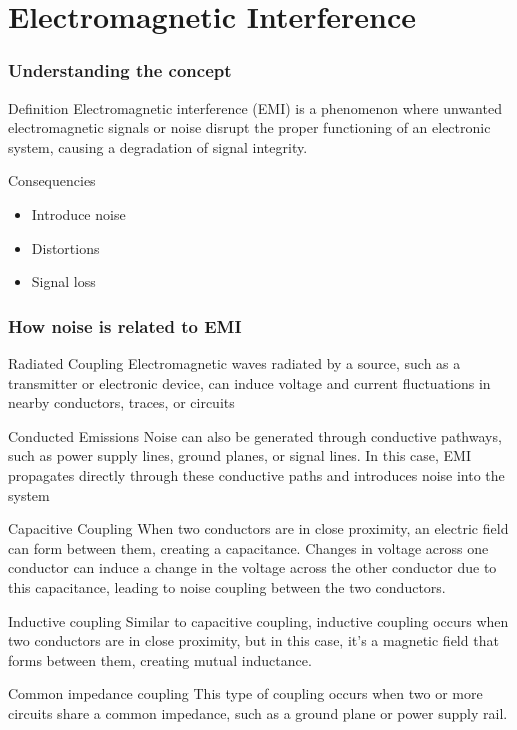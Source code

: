 \documentclass[10pt,hyperref={pdfpagemode=FullScreen},aspectratio=169]{beamer}
\begin{document}
\section{Electromagnetic Interference}


\begin{frame}
  \frametitle{Understanding the concept}

  \begin{block}{Definition}
    Electromagnetic interference (EMI) is a phenomenon where unwanted electromagnetic signals or noise disrupt the proper functioning of an electronic system, causing a degradation of signal integrity.
  \end{block}

  \begin{block}{Consequencies}
    \begin{itemize}
      \item Introduce noise
      \item Distortions
      \item Signal loss
    \end{itemize}
  \end{block}

\end{frame}


\begin{frame}
  \frametitle{How noise is related to EMI}

  \begin{block}{Radiated Coupling}
    Electromagnetic waves radiated by a source, such as a transmitter or electronic device, can induce voltage and current fluctuations in nearby conductors, traces, or circuits
  \end{block}
  \begin{block}{Conducted Emissions}
    Noise can also be generated through conductive pathways, such as power supply lines, ground planes, or signal lines. In this case, EMI propagates directly through these conductive paths and introduces noise into the system
  \end{block}
  \begin{block}{Capacitive Coupling}
    When two conductors are in close proximity, an electric field can form between them, creating a capacitance. Changes in voltage across one conductor can induce a change in the voltage across the other conductor due to this capacitance, leading to noise coupling between the two conductors.
  \end{block}
  \begin{block}{Inductive coupling}
    Similar to capacitive coupling, inductive coupling occurs when two conductors are in close proximity, but in this case, it's a magnetic field that forms between them, creating mutual inductance. 
  \end{block}
  \begin{block}{Common impedance coupling}
    This type of coupling occurs when two or more circuits share a common impedance, such as a ground plane or power supply rail. 
  \end{block}
  
\end{frame}
\end{document}
